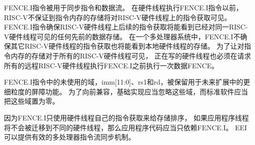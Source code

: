 FENCE.I指令被用于同步指令和数据流。
在硬件线程执行FENCE.I指令以前，RISC-V不保证到指令内存的存储将对RISC-V硬件线程上的指令获取可见。
FENCE.I指令确保RISC-V硬件线程上后续的指令获取将能看到已经对同一RISC-V硬件线程可见的任何先前的数据存储。
在一个多处理器系统中，FENCE.I不确保其它RISC-V硬件线程的指令获取也将能看到本地硬件线程的存储。
为了让对指令内存的存储对于所有的RISC-V硬件线程可见，
正在写的硬件线程也必须在请求所有的远程RISC-V硬件线程执行FENCE.I之前执行一次数据FENCE。

FENCE.I指令中的未使用的域，imm[11:0]、rs1和rd，被保留用于未来扩展中的更细粒度的屏障功能。
为了向前兼容，基础实现应当忽略这些域，而标准软件应当把这些域置为零。

\begin{commentary}
因为FENCE.I只使用硬件线程自己的指令获取来给存储排序，
如果应用程序线程将不会被迁移到不同的硬件线程，那么应用程序代码应当只依赖FENCE.I。
EEI可以提供有效的多处理器指令流同步机制。
\end{commentary}


